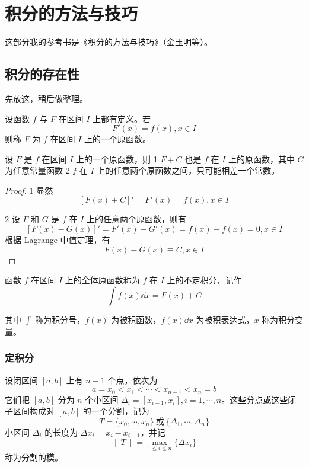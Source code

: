 \chapter{积分的方法与技巧}

这部分我的参考书是《积分的方法与技巧》（金玉明等）。

\section{积分的存在性}

先放这，稍后做整理。

\begin{definition}
    设函数 $f$ 与 $F$ 在区间 $I$ 上都有定义。若
    $$F'(x) = f(x), x\in I$$
    则称 $F$ 为 $f$ 在区间 $I$ 上的一个原函数。
\end{definition}

\begin{theorem}
    设 $F$ 是 $f$ 在区间 $I$ 上的一个原函数，则
    \num{1} $F+C$ 也是 $f$ 在 $I$ 上的原函数，其中 $C$ 为任意常量函数
    \num{2} $f$ 在 $I$ 上的任意两个原函数之间，只可能相差一个常数。
\end{theorem}
\begin{proof}
    \num{1} 显然
    $$\left[ F(x)+C \right]' = F'(x) = f(x), x\in I$$
    
    \num{2} 设 $F$ 和 $G$ 是 $f$ 在 $I$ 上的任意两个原函数，则有
    $$\left[ F(x)-G(x) \right]' = F'(x) - G'(x) = f(x) - f(x) = 0, x\in I$$
    根据 Lagrange 中值定理，有
    $$F(x) - G(x) \equiv C, x\in I$$
\end{proof}

\begin{definition}
    函数 $f$ 在区间 $I$ 上的全体原函数称为 $f$ 在 $I$ 上的不定积分，记作
    $$\int f(x) \dd x = F(x) + C$$
\end{definition}

其中 $\displaystyle\int$ 称为积分号，$f(x)$ 为被积函数，$f(x)\dd x$ 为被积表达式，$x$ 称为积分变量。

\subsection{定积分}

设闭区间 $[a,b]$ 上有 $n-1$ 个点，依次为
$$a = x_0 < x_1 < \cdots < x_{n-1} < x_n = b$$
它们把 $[a,b]$ 分为 $n$ 个小区间 $\Delta_i = [x_{i-1},x_i], i=1,\cdots,n$。这些分点或这些闭子区间构成对 $[a,b]$ 的一个分割，记为
$$T=\{x_0,\cdots,x_n\}\ \text{或}\ \{\Delta_1,\cdots,\Delta_n\}$$
小区间 $\Delta_i$ 的长度为 $\Delta x_i = x_i-x_{i-1}$，并记 
$$\| T \| = \max_{1 \leqslant i \leqslant n}\{\Delta x_i\}$$
称为分割的模。

